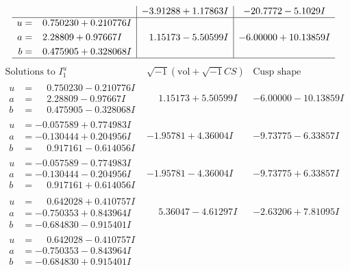 \documentclass[1p]{elsarticle_modified}
\theoremstyle{definition}
\newcommand{\I}{\sqrt{-1}}
\begin{document}
$$\begin{array}{c|c|c}
 & -3.91288 + 1.17863 I & -20.7772 - 5.1029 I \\ \hline\begin{aligned}
u &= \phantom{-}0.750230 + 0.210776 I \\
a &= \phantom{-}2.28809 + 0.97667 I \\
b &= \phantom{-}0.475905 + 0.328068 I\end{aligned}
 & \phantom{-}1.15173 - 5.50599 I & -6.00000 + 10.13859 I\\
 \hline 
 \end{array}$$\newpage$$\begin{array}{c|c|c}  
\text{Solutions to }I^u_{1}& \I (\text{vol} + \sqrt{-1}CS) & \text{Cusp shape}\\
 \hline 
\begin{aligned}
u &= \phantom{-}0.750230 - 0.210776 I \\
a &= \phantom{-}2.28809 - 0.97667 I \\
b &= \phantom{-}0.475905 - 0.328068 I\end{aligned}
 & \phantom{-}1.15173 + 5.50599 I & -6.00000 - 10.13859 I \\ \hline\begin{aligned}
u &= -0.057589 + 0.774983 I \\
a &= -0.130444 + 0.204956 I \\
b &= \phantom{-}0.917161 - 0.614056 I\end{aligned}
 & -1.95781 + 4.36004 I & -9.73775 - 6.33857 I \\ \hline\begin{aligned}
u &= -0.057589 - 0.774983 I \\
a &= -0.130444 - 0.204956 I \\
b &= \phantom{-}0.917161 + 0.614056 I\end{aligned}
 & -1.95781 - 4.36004 I & -9.73775 + 6.33857 I \\ \hline\begin{aligned}
u &= \phantom{-}0.642028 + 0.410757 I \\
a &= -0.750353 + 0.843964 I \\
b &= -0.684830 - 0.915401 I\end{aligned}
 & \phantom{-}5.36047 - 4.61297 I & -2.63206 + 7.81095 I \\ \hline\begin{aligned}
u &= \phantom{-}0.642028 - 0.410757 I \\
a &= -0.750353 - 0.843964 I \\
b &= -0.684830 + 0.915401 I\end{aligned}

\end{array}$$
\end{document}
